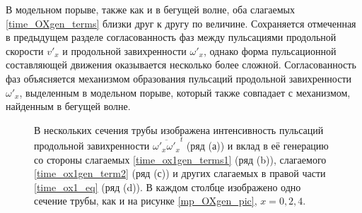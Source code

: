 В модельном порыве, также как и в бегущей волне, оба слагаемых \eqref{time_OXgen_terms} близки друг к другу по величине. Сохраняется отмеченная в предыдущем разделе согласованность фаз между пульсациями продольной скорости $v'_x$ и продольной завихренности $\omega'_x$, однако форма пульсационной составляющей движения оказывается несколько более сложной. Согласованность фаз объясняется механизмом образования пульсаций продольной завихренности $\omega'_x$, выделенным в модельном порыве, который также совпадает с механизмом, найденным в бегущей волне. 

\begin{figure}[h]
\caption{В нескольких сечения трубы изображена интенсивность пульсаций продольной завихренности $\overline{\omega'_x \omega'_x}^t$ (ряд (а)) и вклад в её генерацию со стороны слагаемых \eqref{time_ox1gen_terms1} (ряд (b)), слагаемого \eqref{time_ox1gen_term2} (ряд (с)) и других слагаемых в правой части \eqref{time_ox1_eq} (ряд (d)). В каждом столбце изображено одно сечение трубы, как и на рисунке \ref{mp_OXgen_pic}, $x=0,2,4$.}
\label{mp_ox1gen_pic}
\end{figure}

